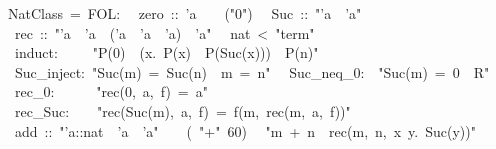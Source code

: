 \begin{isabelle}%
\isanewline
\isanewline
{}~NatClass~=~FOL:\isanewline
\isanewline
{}\isanewline
~~zero~::~'a~~~~({"}0{"})\isanewline
~~Suc~::~{"}'a~{\isasymRightarrow}~'a{"}\isanewline
~~rec~::~{"}'a~{\isasymRightarrow}~'a~{\isasymRightarrow}~('a~{\isasymRightarrow}~'a~{\isasymRightarrow}~'a)~{\isasymRightarrow}~'a{"}\isanewline
\isanewline
{}\isanewline
~~nat~<~{"}term{"}\isanewline
~~induct:~~~~~{"}P(0)~{\isasymLongrightarrow}~({\isasymAnd}x.~P(x)~{\isasymLongrightarrow}~P(Suc(x)))~{\isasymLongrightarrow}~P(n){"}\isanewline
~~Suc\_inject:~{"}Suc(m)~=~Suc(n)~{\isasymLongrightarrow}~m~=~n{"}\isanewline
~~Suc\_neq\_0:~~{"}Suc(m)~=~0~{\isasymLongrightarrow}~R{"}\isanewline
~~rec\_0:~~~~~~{"}rec(0,~a,~f)~=~a{"}\isanewline
~~rec\_Suc:~~~~{"}rec(Suc(m),~a,~f)~=~f(m,~rec(m,~a,~f)){"}\isanewline
\isanewline
{}\isanewline
~~add~::~{"}'a::nat~{\isasymRightarrow}~'a~{\isasymRightarrow}~'a{"}~~~~(~{"}+{"}~60)\isanewline
~~{"}m~+~n~{\isasymequiv}~rec(m,~n,~{\isasymlambda}x~y.~Suc(y)){"}\isanewline
\isanewline
{}\end{isabelle}%
